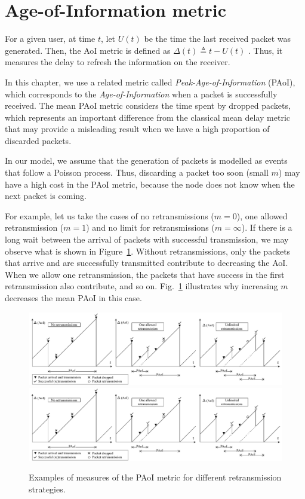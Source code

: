 \section{Age-of-Information metric}

For a given user, at time $t$, let $U(t)$ be the time the last received packet was generated. Then, the AoI metric is defined as $\Delta(t) \triangleq t-U(t)$ \cite{kaul2011minimizing, kaul2012real}.
%
Thus, it measures the delay to refresh the information on the receiver.

In this chapter, we use a related metric called \textit{Peak-Age-of-Information} (PAoI), which corresponds to the \textit{Age-of-Information} when a packet is successfully received.
%
The mean PAoI metric considers the time spent by dropped packets, which represents an important difference from the classical mean delay metric that may provide a misleading result when we have a high proportion of discarded packets.

In our model, we assume that the generation of packets is modelled as events that follow a Poisson process. Thus, discarding a packet too soon (small $m$) may have a high cost in the PAoI metric, because the node does not know when the next packet is coming.

For example, let us take the cases of no retransmissions ($m=0$), one allowed retransmission ($m=1$) and no limit for retransmissions ($m = \infty$). If there is a long wait between the arrival of packets with successful transmission, we may observe what is shown in Figure~\ref{fig:PAoI_examples}.
%
Without retransmissions, only the packets that arrive and are successfully transmitted contribute to decreasing the AoI. When we allow one retransmission, the packets that have success in the first retransmission also contribute, and so on.
%
Fig.~\ref{fig:PAoI_examples} illustrates why increasing $m$ decreases the mean PAoI in this case.
%
\begin{figure}[htb]
    \centering
    \if{}
        \includegraphics[width=\textwidth]{Figures/Ch6_PAoI_Intro.pdf}
    \else
        \includegraphics[width=\textwidth,draft]{Figures/Ch6_PAoI_Intro.pdf}
    \fi
    \caption{Examples of measures of the PAoI metric for different retransmission strategies.}
    \label{fig:PAoI_examples}
\end{figure}

